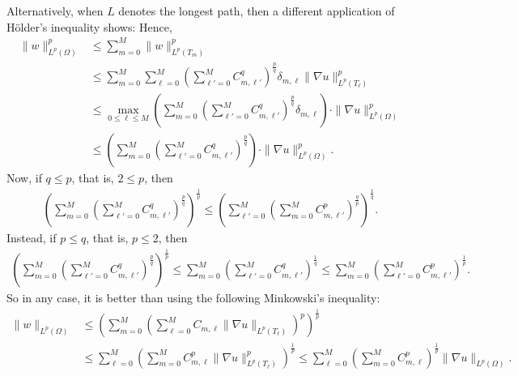 \documentclass[10pt,a4paper]{article}
\begin{document}
    Alternatively, when $L$ denotes the longest path, then a different application of H\"older's inequality shows:
    Hence, 
    \begin{align}
        \| w \|_{L^{p}(\Omega)}^{p}
        &
        \leq 
        \sum_{m=0}^{M}
        \| w \|_{L^{p}(T_{m})}^{p}
        \\&
        \leq 
        \sum_{m=0}^{M}
        \sum_{\ell=0}^{M} 
        \left( \sum_{\ell'=0}^{M} C_{m,\ell'}^{q} \right)^{\frac p q}
        \delta_{m,\ell} \| \nabla u \|_{L^{p}(T_{\ell})}^{p} 
        \\&
        \leq 
        \max_{0 \leq \ell \leq M} \left(
            \sum_{m=0}^{M}
            \left( \sum_{\ell'=0}^{M} C_{m,\ell'}^{q} \right)^{\frac p q}
            \delta_{m,\ell} 
        \right)
        \cdot 
        \| \nabla u \|_{L^{p}(\Omega)}^{p} 
        \\&
        \leq 
        \left(
            \sum_{m=0}^{M}
            \left( \sum_{\ell'=0}^{M} C_{m,\ell'}^{q} \right)^{\frac p q}
        \right)
        \cdot 
        \| \nabla u \|_{L^{p}(\Omega)}^{p} 
        .
    \end{align}
    Now, if $q \leq p$, that is, $2 \leq p$, then 
    \begin{align}
        \left(
            \sum_{m=0}^{M}
            \left( \sum_{\ell'=0}^{M} C_{m,\ell'}^{q} \right)^{\frac p q}
        \right)^{\frac 1 p}
        \leq 
        \left(
            \sum_{\ell'=0}^{M}
            \left( \sum_{m=0}^{M} C_{m,\ell'}^{p} \right)^{\frac q p}
        \right)^{\frac 1 q}
        .
    \end{align}
    Instead, if $p \leq q$, that is, $p \leq 2$, then 
    \begin{align}
        \left(
            \sum_{m=0}^{M}
            \left( \sum_{\ell'=0}^{M} C_{m,\ell'}^{q} \right)^{\frac p q}
        \right)^{\frac 1 p}
        \leq 
        \sum_{m=0}^{M}
        \left( \sum_{\ell'=0}^{M} C_{m,\ell'}^{q} \right)^{\frac 1 q}
        \leq 
        \sum_{m=0}^{M}
        \left( \sum_{\ell'=0}^{M} C_{m,\ell'}^{p} \right)^{\frac 1 p}
        .
    \end{align}
    So in any case, it is better than using the following Minkowski's inequality: 
    \begin{align}
        \| w \|_{L^{p}(\Omega)}
        &
        \leq 
        \left( \sum_{m=0}^{M} \left( \sum_{\ell=0}^{M} C_{m,\ell} \| \nabla u \|_{L^{p}(T_{\ell})} \right)^{p} \right)^{\frac 1 p}
        \\&
        \leq 
        \sum_{\ell=0}^{M}
        \left( \sum_{m=0}^{M} C_{m,\ell}^{p} \| \nabla u \|_{L^{p}(T_{\ell})}^{p} \right)^{\frac 1 p}
        \leq 
        \sum_{\ell=0}^{M}
        \left( \sum_{m=0}^{M} C_{m,\ell}^{p} \right)^{\frac 1 p}
        \| \nabla u \|_{L^{p}(\Omega)}
        .
    \end{align}
\end{document}
